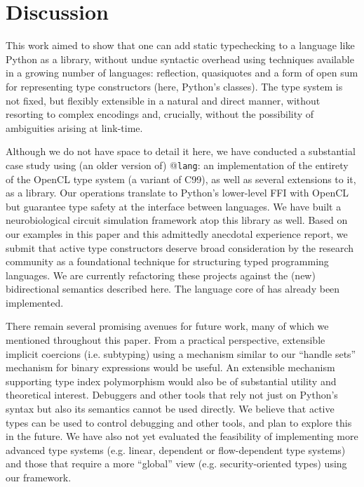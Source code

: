\documentclass[9pt,preprint]{sigplanconf}
\begin{document}
\section{Discussion}\label{discussion}
This work aimed to show that one can add static typechecking to a language like Python as a library, without undue syntactic overhead using techniques available in a growing number of languages: reflection, quasiquotes and a form of open sum for representing type constructors (here, Python's classes). The type system is not fixed, but flexibly extensible in a natural and direct manner, without resorting to complex encodings and, crucially, without the possibility of ambiguities arising at link-time. 

Although we do not have space to detail it here, we have conducted a substantial case study using (an older version of) @\texttt{lang}: an implementation of the entirety of the OpenCL type system (a variant of C99), as well as several extensions to it, as a library. Our operations translate to Python's lower-level FFI with OpenCL but guarantee type safety at the interface between languages. We have built a neurobiological circuit simulation framework atop this library as well. Based on our examples in this paper and this admittedly anecdotal experience report, we submit that active type constructors deserve broad consideration by the research community as a foundational technique for structuring typed programming languages. We are currently refactoring these projects against the (new) bidirectional semantics described here. The language core of  has already been implemented.

There remain several promising avenues for future work, many of which we mentioned throughout this paper. From a practical perspective, extensible implicit coercions (i.e. subtyping) using a mechanism similar to our ``handle sets'' mechanism for binary expressions would be useful. An extensible mechanism supporting type index polymorphism would also be of substantial utility and theoretical interest. Debuggers and other tools that rely not just on Python's syntax but also its semantics cannot be used directly. We believe that active types can be used to control debugging and other tools, and plan to explore this in the future. We have also not yet evaluated the feasibility of implementing more advanced type systems (e.g. linear, dependent or flow-dependent type systems) and those that require a more ``global'' view (e.g. security-oriented types) using our framework.
\end{document}
